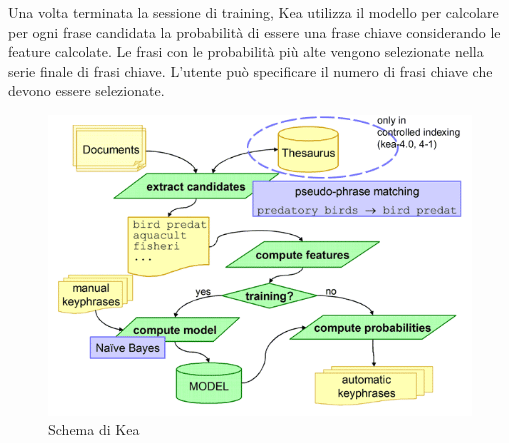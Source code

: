 Una volta terminata la sessione di training, Kea utilizza il modello per calcolare per ogni frase candidata la probabilità di essere una frase chiave considerando le feature calcolate. Le frasi con le probabilità più alte vengono selezionate nella serie finale di frasi chiave. L'utente può specificare il numero di frasi chiave che devono essere selezionate\cite{kea}.

\begin{figure}[H]
\centering
\includegraphics[scale=1]{res/kea_diagram.png}
\caption{Schema di Kea}
\label{fig:kea}
\end{figure}
